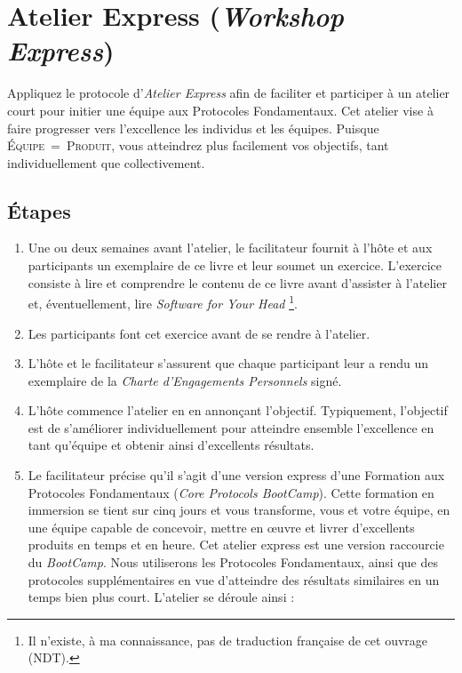 \documentclass[paper=6in:9in,pagesize=pdftex,headinclude=on,footinclude=on,12pt]{scrbook}
\begin{document}
\section{Atelier Express (\emph{Workshop Express})} \label{atelier-express}

Appliquez le protocole d'\emph{Atelier Express} afin de faciliter et participer à un atelier court pour initier une équipe aux Protocoles Fondamentaux. Cet
atelier vise à faire progresser vers l'excellence les individus et les équipes. Puisque \textsc{Équipe~=~Produit}, vous atteindrez plus facilement vos
objectifs, tant individuellement que collectivement.

\subsection{Étapes}
\begin{enumerate}
	\item Une ou deux semaines avant l'atelier, le facilitateur fournit à l'hôte et aux participants un exemplaire de ce livre et leur soumet un exercice. L'exercice consiste à
        lire et comprendre le contenu de ce livre avant d'assister à l'atelier et, éventuellement, lire \emph{Software for Your Head}
	      \footnote{Il n'existe, à ma connaissance, pas de traduction française de cet ouvrage (NDT).}.
	\item Les participants font cet exercice avant de se rendre à l'atelier.
	\item L'hôte et le facilitateur s'assurent que chaque participant leur a rendu un exemplaire de la \emph{Charte d'Engagements Personnels} signé.
	\item L'hôte commence l'atelier en en annonçant l'objectif. Typiquement, l'objectif est de s'améliorer individuellement pour atteindre ensemble l'excellence en tant
	      qu'équipe et obtenir ainsi d'excellents résultats.
	\item Le facilitateur précise qu'il s'agit d'une version \og{}express\fg{} d'une Formation aux Protocoles Fondamentaux (\emph{Core Protocols BootCamp}). Cette
	      formation en immersion se tient sur cinq jours et vous transforme, vous et votre équipe, en une équipe capable de concevoir, mettre en œuvre et livrer d'excellents
	      produits en temps et en heure. Cet atelier express est une version raccourcie du \emph{BootCamp}. Nous utiliserons les Protocoles Fondamentaux, ainsi que des protocoles
            supplémentaires en vue d'atteindre des résultats similaires en un temps bien plus court. L'atelier se déroule ainsi :

\end{enumerate}
\end{document}
